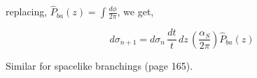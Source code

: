 \documentclass[main.tex]{subfiles}
\begin{document}
replacing, \(\hat{P}_{ba}(z) = \int \frac{d\phi}{2\pi}\), we get, 

\begin{equation}
    d\sigma_{n+1}= d\sigma_n \, \frac{dt}{t}\, dz \, (\frac{\alpha_S }{2\pi} ) \hat{P}_{ba}(z)
\end{equation}

Similar for spacelike branchings (page 165).
\end{document}
